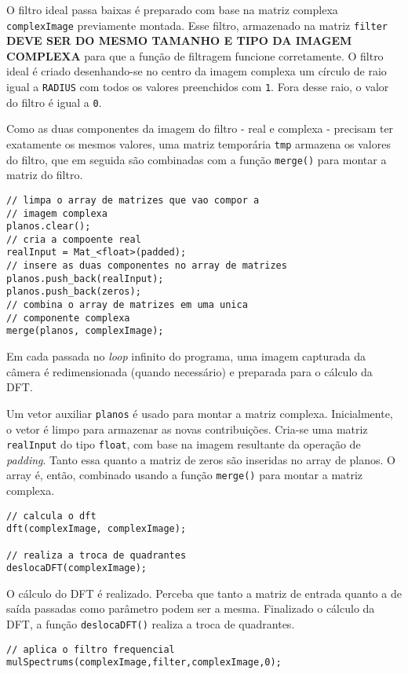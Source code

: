 \documentclass[11pt]{amsbook}
\begin{document}
O filtro ideal passa baixas é preparado com base na matriz complexa
\texttt{complexImage} previamente montada. Esse filtro, armazenado na matriz
\texttt{filter} \textbf{DEVE SER DO MESMO TAMANHO E TIPO DA IMAGEM COMPLEXA} para
que a função de filtragem funcione corretamente. O filtro ideal é
criado desenhando-se no centro da imagem complexa um círculo de raio
igual a \texttt{RADIUS} com todos os valores preenchidos com \texttt{1}. Fora desse
raio, o valor do filtro é igual a \texttt{0}.


Como as duas componentes da imagem do filtro - real e complexa -
precisam ter exatamente os mesmos valores, uma matriz temporária \texttt{tmp}
armazena os valores do filtro, que em seguida são combinadas com a
função \texttt{merge()} para montar a matriz do filtro.


\begin{verbatim}
// limpa o array de matrizes que vao compor a
// imagem complexa
planos.clear();
// cria a compoente real
realInput = Mat_<float>(padded);
// insere as duas componentes no array de matrizes
planos.push_back(realInput);
planos.push_back(zeros);
// combina o array de matrizes em uma unica
// componente complexa
merge(planos, complexImage);
\end{verbatim}

Em cada passada no \emph{loop} infinito do programa, uma imagem capturada
da câmera é redimensionada (quando necessário) e preparada para o
cálculo da DFT.


Um vetor auxiliar \texttt{planos} é usado para montar a matriz
complexa. Inicialmente, o vetor é limpo para armazenar as novas
contribuições. Cria-se uma matriz \texttt{realInput} do tipo \texttt{float}, com
base na imagem resultante da operação de \emph{padding}. Tanto essa quanto
a matriz de zeros são inseridas no array de planos. O array é, então,
combinado usando a função \texttt{merge()} para montar a matriz complexa.


\begin{verbatim}
// calcula o dft
dft(complexImage, complexImage);

// realiza a troca de quadrantes
deslocaDFT(complexImage);
\end{verbatim}

O cálculo do DFT é realizado. Perceba que tanto a matriz de entrada
quanto a de saída passadas como parâmetro podem ser a
mesma. Finalizado o cálculo da DFT, a função \texttt{deslocaDFT()} realiza a
troca de quadrantes.


\begin{verbatim}
// aplica o filtro frequencial
mulSpectrums(complexImage,filter,complexImage,0);
\end{verbatim}
\end{document}
